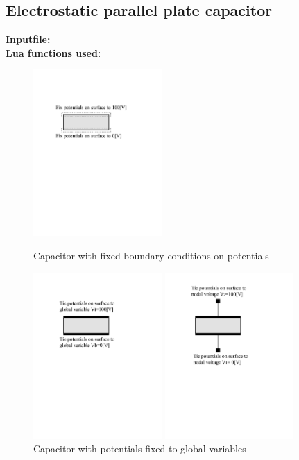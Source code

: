 \clearpage
\subsection{Electrostatic parallel plate capacitor}
\begin{flushleft}
  \textbf{Inputfile:}
  \\
  \textbf{Lua functions used:}
\end{flushleft}

\begin{figure}[htbp]
\begin{minipage}{0.3\linewidth}
\includegraphics[trim = 1in 4.5in 2in 0.5in, clip, height = 2.5in]{fig/e_capacitor_fix.pdf}
\caption{Capacitor with fixed boundary conditions on potentials}
\end{minipage}
\hfill
\begin{minipage}{0.3\linewidth}
\includegraphics[trim = 1in 4.5in 2in 0.5in, clip, height = 2.5in]{fig/e_capacitor_globals.pdf}
\caption{Capacitor with potentials fixed to global variables}
\end{minipage}
\hfill
\begin{minipage}{0.3\linewidth}
\includegraphics[trim = 1in 4.5in 2in 0.5in, clip, height = 2.5in]{fig/e_capacitor_electrodes.pdf}

\end{minipage}
\end{figure}
